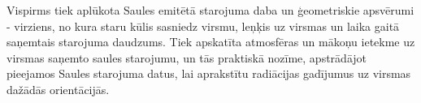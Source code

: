 Vispirms tiek aplūkota Saules emitētā starojuma daba un ģeometriskie apsvērumi - virziens, no kura staru kūlis sasniedz virsmu, leņķis uz virsmas un laika gaitā saņemtais starojuma daudzums. Tiek apskatīta atmosfēras un mākoņu ietekme uz virsmas saņemto saules starojumu, un tās praktiskā nozīme, apstrādājot pieejamos Saules starojuma datus, lai aprakstītu radiācijas gadījumus uz virsmas dažādās orientācijās.

